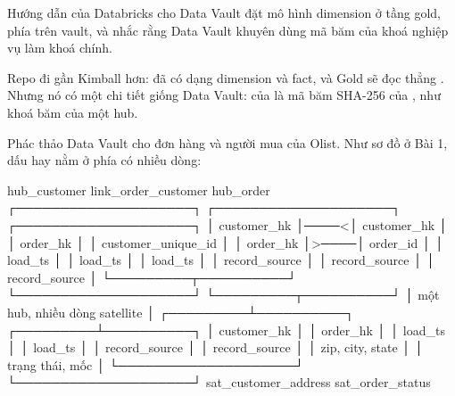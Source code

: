 Hướng dẫn của Databricks cho Data Vault đặt mô hình dimension ở tầng gold, phía trên vault, và nhắc rằng Data Vault khuyên dùng mã băm của khoá nghiệp vụ làm khoá chính.

Repo  đi gần Kimball hơn:  đã có dạng dimension và fact, và Gold sẽ đọc thẳng . Nhưng nó có một chi tiết giống Data Vault:  của  là mã băm SHA-256 của , như khoá băm của một hub.

Phác thảo Data Vault cho đơn hàng và người mua của Olist. Như sơ đồ ở Bài 1, dấu \code{<} hay \code{>} nằm ở phía có nhiều dòng:

\begin{codeblock}[samepage=true]
hub_customer               link_order_customer        hub_order
┌────────────────────┐     ┌────────────────────┐     ┌────────────────────┐
│ customer_hk        │────<│ customer_hk        │     │ order_hk           │
│ customer_unique_id │     │ order_hk           │>────│ order_id           │
│ load_ts            │     │ load_ts            │     │ load_ts            │
│ record_source      │     │ record_source      │     │ record_source      │
└─────────┬──────────┘     └────────────────────┘     └─────────┬──────────┘
          │ một hub, nhiều dòng satellite                       │
┌─────────┴──────────┐                                ┌─────────┴──────────┐
│ customer_hk        │                                │ order_hk           │
│ load_ts            │                                │ load_ts            │
│ record_source      │                                │ record_source      │
│ zip, city, state   │                                │ trạng thái, mốc    │
└────────────────────┘                                └────────────────────┘
sat_customer_address                                  sat_order_status
\end{codeblock}

